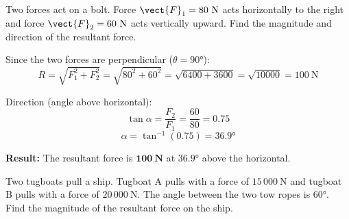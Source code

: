 \begin{examplebox}[2.3]
Two forces act on a bolt. Force $\vect{F}_1 = 80\ \text{N}$
acts horizontally to the right and force
$\vect{F}_2 = 60\ \text{N}$ acts vertically upward.
Find the magnitude and direction of the resultant force.
\end{examplebox}

\begin{solutionbox}
Since the two forces are perpendicular ($\theta = 90°$):
\[
  R = \sqrt{F_1^2 + F_2^2}
  = \sqrt{80^2 + 60^2}
  = \sqrt{6400 + 3600}
  = \sqrt{10000}
  = 100\ \text{N}
\]

Direction (angle above horizontal):
\[
  \tan\alpha = \frac{F_2}{F_1} = \frac{60}{80} = 0.75
\]
\[
  \alpha = \tan^{-1}(0.75) = 36.9°
\]

\textbf{Result:} The resultant force is
$\mathbf{100\ \text{N}}$ at $\mathbf{36.9°}$ above the
horizontal.

\begin{center}
\end{center}
\end{solutionbox}

\begin{examplebox}[2.4]
Two tugboats pull a ship. Tugboat A pulls with a force of
$15\,000\ \text{N}$ and tugboat B pulls with a force of
$20\,000\ \text{N}$. The angle between the two tow ropes
is $60°$. Find the magnitude of the resultant force on
the ship.
\end{examplebox}

